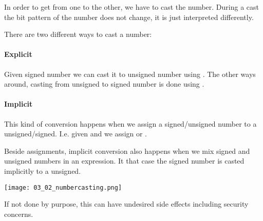 In order to get from one to the other, we have to cast the number. During a cast the bit pattern of the number does not change, it is just interpreted differently.

There are two different ways to cast a number:

\paragraph{Explicit}
Given signed number  we can cast it to unsigned number  using . The other ways around, casting from unsigned  to signed number  is done using .

\paragraph{Implicit}
This kind of conversion happens when we assign a signed/unsigned number to a unsigned/signed. I.e. given  and we assign  or .

Beside assignments, implicit conversion also happens when we mix signed and unsigned numbers in an expression. It that case the signed number is casted implicitly to a unsigned. 

\texttt{[image: 03\_02\_numbercasting.png]}

If not done by purpose, this can have undesired side effects including security concerns.
